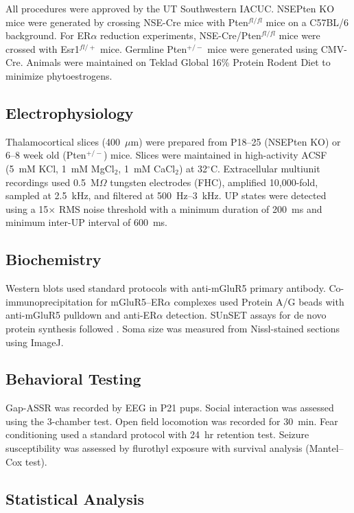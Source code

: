 \documentclass[11pt]{article}
\begin{document}
All procedures were approved by the UT Southwestern IACUC. NSEPten KO mice were generated by crossing NSE-Cre mice with Pten$^{fl/fl}$ mice on a C57BL/6 background. For ER$\alpha$ reduction experiments, NSE-Cre/Pten$^{fl/fl}$ mice were crossed with Esr1$^{fl/+}$ mice. Germline Pten$^{+/-}$ mice were generated using CMV-Cre. Animals were maintained on Teklad Global 16\% Protein Rodent Diet to minimize phytoestrogens.

\subsection{Electrophysiology}

Thalamocortical slices (400~$\mu$m) were prepared from P18--25 (NSEPten KO) or 6--8 week old (Pten$^{+/-}$) mice. Slices were maintained in high-activity ACSF (5~mM KCl, 1~mM MgCl$_2$, 1~mM CaCl$_2$) at 32$^\circ$C. Extracellular multiunit recordings used 0.5~M$\Omega$ tungsten electrodes (FHC), amplified 10,000-fold, sampled at 2.5~kHz, and filtered at 500~Hz--3~kHz. UP states were detected using a 15$\times$ RMS noise threshold with a minimum duration of 200~ms and minimum inter-UP interval of 600~ms.

\subsection{Biochemistry}

Western blots used standard protocols with anti-mGluR5 primary antibody. Co-immunoprecipitation for mGluR5--ER$\alpha$ complexes used Protein A/G beads with anti-mGluR5 pulldown and anti-ER$\alpha$ detection. SUnSET assays for de novo protein synthesis followed \citet{schmidt2009sUnSET}. Soma size was measured from Nissl-stained sections using ImageJ.

\subsection{Behavioral Testing}

Gap-ASSR was recorded by EEG in P21 pups. Social interaction was assessed using the 3-chamber test. Open field locomotion was recorded for 30~min. Fear conditioning used a standard protocol with 24~hr retention test. Seizure susceptibility was assessed by flurothyl exposure with survival analysis (Mantel--Cox test).

\subsection{Statistical Analysis}
\end{document}
